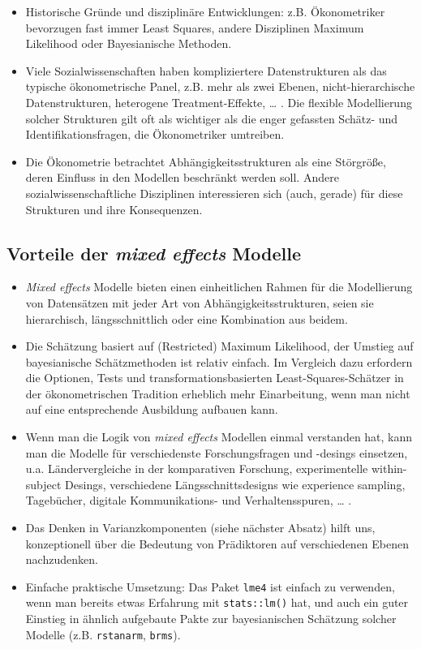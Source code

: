 \documentclass[
]{book}
\begin{document}
\begin{itemize}
\item
  Historische Gründe und disziplinäre Entwicklungen: z.B. Ökonometriker bevorzugen fast immer Least Squares, andere Disziplinen Maximum Likelihood oder Bayesianische Methoden.
\item
  Viele Sozialwissenschaften haben kompliziertere Datenstrukturen als das typische ökonometrische Panel, z.B. mehr als zwei Ebenen, nicht-hierarchische Datenstrukturen, heterogene Treatment-Effekte, \ldots{} . Die flexible Modellierung solcher Strukturen gilt oft als wichtiger als die enger gefassten Schätz- und Identifikationsfragen, die Ökonometriker umtreiben.
\item
  Die Ökonometrie betrachtet Abhängigkeitsstrukturen als eine Störgröße, deren Einfluss in den Modellen beschränkt werden soll. Andere sozialwissenschaftliche Disziplinen interessieren sich (auch, gerade) für diese Strukturen und ihre Konsequenzen.
\end{itemize}

\hypertarget{vorteile-der-mixed-effects-modelle}{%
\subsection{\texorpdfstring{Vorteile der \emph{mixed effects} Modelle}{Vorteile der mixed effects Modelle}}\label{vorteile-der-mixed-effects-modelle}}

\begin{itemize}
\item
  \emph{Mixed effects} Modelle bieten einen einheitlichen Rahmen für die Modellierung von Datensätzen mit jeder Art von Abhängigkeitsstrukturen, seien sie hierarchisch, längsschnittlich oder eine Kombination aus beidem.
\item
  Die Schätzung basiert auf (Restricted) Maximum Likelihood, der Umstieg auf bayesianische Schätzmethoden ist relativ einfach. Im Vergleich dazu erfordern die Optionen, Tests und transformationsbasierten Least-Squares-Schätzer in der ökonometrischen Tradition erheblich mehr Einarbeitung, wenn man nicht auf eine entsprechende Ausbildung aufbauen kann.
\item
  Wenn man die Logik von \emph{mixed effects} Modellen einmal verstanden hat, kann man die Modelle für verschiedenste Forschungsfragen und -desings einsetzen, u.a. Ländervergleiche in der komparativen Forschung, experimentelle within-subject Desings, verschiedene Längsschnittsdesigns wie experience sampling, Tagebücher, digitale Kommunikations- und Verhaltensspuren, \ldots{} .
\item
  Das Denken in Varianzkomponenten (siehe nächster Absatz) hilft uns, konzeptionell über die Bedeutung von Prädiktoren auf verschiedenen Ebenen nachzudenken.
\item
  Einfache praktische Umsetzung: Das Paket \texttt{lme4} ist einfach zu verwenden, wenn man bereits etwas Erfahrung mit \texttt{stats::lm()} hat, und auch ein guter Einstieg in ähnlich aufgebaute Pakte zur bayesianischen Schätzung solcher Modelle (z.B. \texttt{rstanarm}, \texttt{brms}).
\end{itemize}
\end{document}
